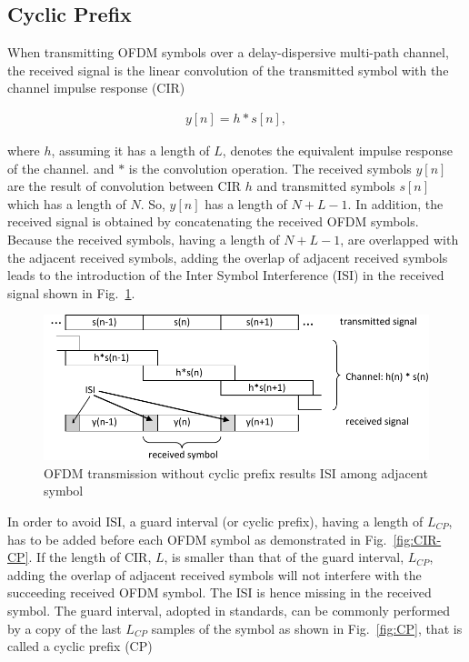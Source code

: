 \subsection{Cyclic Prefix}

When transmitting OFDM symbols over a delay-dispersive multi-path channel, the received signal is the linear convolution of the transmitted symbol with the channel impulse
response (CIR) 

\begin{eqnarray}
\label{equ:sampledOFDMsignal}
y[n] = h*s[n],
\end{eqnarray} 

where $h$, assuming it has a length of $L$, denotes the equivalent impulse response of the channel. and $*$ is the convolution operation. 
The received symbols $y[n]$ are the result of convolution between CIR $h$ and transmitted symbols $s[n]$ which has a length of $N$.
So,  $y[n]$ has a length of $N+L-1$.
In addition, the received signal is obtained by concatenating the received OFDM symbols. 
Because the received symbols, having a length of $N+L-1$, are overlapped with the adjacent received symbols, adding the overlap of adjacent received symbols leads to the introduction of the Inter Symbol Interference (ISI) in the received signal shown in Fig.~\ref{fig:CIR-noCP}.


\begin{figure}
	\centerline{\includegraphics [width=0.8\columnwidth] {Figures/CIR_noCP.pdf} }
	\caption{OFDM transmission without cyclic prefix results ISI among adjacent symbol}
	\label{fig:CIR-noCP}
\end{figure}

In order to avoid ISI, a guard interval (or cyclic prefix), having a length of $L_{CP}$, has to be added before each OFDM symbol as demonstrated in Fig.~\ref{fig:CIR-CP}. 
If the length of CIR, $L$, is smaller than that of the guard interval, $L_{CP}$, adding the overlap of adjacent received symbols will not interfere with the succeeding received OFDM symbol. 
The ISI is hence missing in the received symbol.  
The guard interval, adopted in standards, can be commonly performed by a copy of the last $L_{CP}$ samples of the symbol as shown in Fig.~\ref{fig:CP}, that is called a cyclic prefix (CP)

